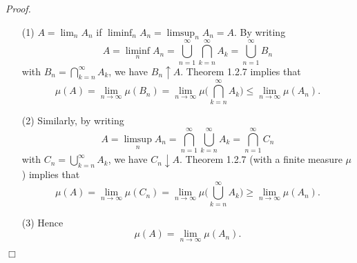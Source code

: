 \documentclass{article}
\begin{document}
\emph{Proof.}
\begin{enumerate}
\item[(1)]
  $A = \lim_n A_n$ if $\liminf_n A_n = \limsup_n A_n = A$.
  By writing
  \[
    A
    = \liminf_n A_n
    = \bigcup_{n=1}^{\infty} \bigcap_{k=n}^{\infty} A_k
    = \bigcup_{n=1}^{\infty} B_n
  \]
  with $B_n = \bigcap_{k=n}^{\infty} A_k$, we have $B_n \uparrow A$.
  Theorem 1.2.7 implies that
  \[
    \mu(A)
    = \lim_{n \to \infty} \mu(B_n)
    = \lim_{n \to \infty} \mu\bigg( \bigcap_{k=n}^{\infty} A_k \bigg)
    \leq \lim_{n \to \infty} \mu(A_n).
  \]

\item[(2)]
  Similarly, by writing
  \[
    A
    = \limsup_n A_n
    = \bigcap_{n=1}^{\infty} \bigcup_{k=n}^{\infty} A_k
    = \bigcap_{n=1}^{\infty} C_n
  \]
  with $C_n = \bigcup_{k=n}^{\infty} A_k$, we have $C_n \downarrow A$.
  Theorem 1.2.7 (with a finite measure $\mu$) implies that
  \[
    \mu(A)
    = \lim_{n \to \infty} \mu(C_n)
    = \lim_{n \to \infty} \mu\bigg( \bigcup_{k=n}^{\infty} A_k \bigg)
    \geq \lim_{n \to \infty} \mu(A_n).
  \]

\item[(3)]
  Hence
  \[
    \mu(A) = \lim_{n \to \infty} \mu(A_n).
  \]
\end{enumerate}
$\Box$ \\\\






\end{document}
